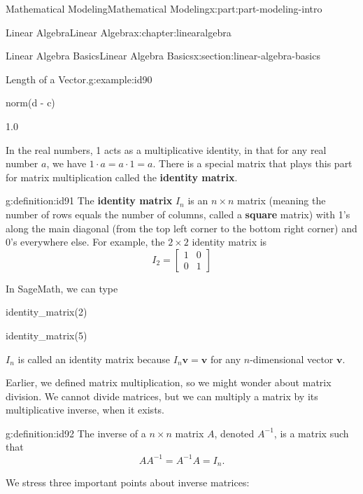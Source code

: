 \documentclass[oneside,10pt,]{book}
\newcommand{\terminology}[1]{\textbf{#1}}
\numberwithin{equation}{section}
\begin{document}
\begin{partptx}{Mathematical Modeling}{}{Mathematical Modeling}{}{}{x:part:part-modeling-intro}
\begin{chapterptx}{Linear Algebra}{}{Linear Algebra}{}{}{x:chapter:linearalgebra}
\begin{sectionptx}{Linear Algebra Basics}{}{Linear Algebra Basics}{}{}{x:section:linear-algebra-basics}
\begin{example}{Length of a Vector.}{g:example:id90}
\begin{sageinput}
norm(d - c)
\end{sageinput}
\begin{sageoutput}
1.0
\end{sageoutput}
\end{example}
In the real numbers, 1 acts as a multiplicative identity, in that for any real number \(a\), we have \(1\cdot a = a\cdot 1 = a\). There is a special matrix that plays this part for matrix multiplication called the \terminology{identity matrix}.%
\begin{definition}{}{g:definition:id91}%
The \terminology{identity matrix} \(I_n\) is an \(n\times n\) matrix (meaning the number of rows equals the number of columns, called a \terminology{square} matrix) with 1's along the main diagonal (from the top left corner to the bottom right corner) and 0's everywhere else. For example, the \(2\times 2\) identity matrix is%
%
\begin{equation*}
I_2 = \begin{bmatrix}
1 & 0 \\
0 & 1
\end{bmatrix}
\end{equation*}
\end{definition}
In SageMath, we can type%
\begin{sageinput}
identity_matrix(2)
\end{sageinput}
\begin{sageoutput}
[1 0]
[0 1]
\end{sageoutput}
\begin{sageinput}
identity_matrix(5)
\end{sageinput}
\begin{sageoutput}
[1 0 0 0 0]
[0 1 0 0 0]
[0 0 1 0 0]
[0 0 0 1 0]
[0 0 0 0 1]
\end{sageoutput}
\(I_n\) is called an identity matrix because \(I_n \mathbf{v} = \mathbf{v}\) for any \(n\)-dimensional vector \(\mathbf{v}\).%
\par
Earlier, we defined matrix multiplication, so we might wonder about matrix division. We cannot divide matrices, but we can multiply a matrix by its multiplicative inverse, when it exists.%
\begin{definition}{}{g:definition:id92}%
The inverse of a \(n\times n\) matrix \(A\), denoted \(A^{-1}\), is a matrix such that%
%
\begin{equation*}
AA^{-1} = A^{-1} A = I_n.
\end{equation*}
\end{definition}
We stress three important points about inverse matrices:%

\end{sectionptx}
\end{chapterptx}
\end{partptx}
\end{document}
